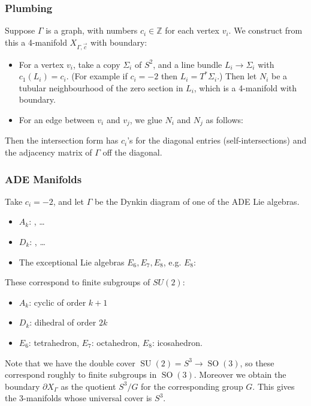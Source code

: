 \documentclass{article}
\theoremstyle{definition}
\DeclareMathOperator{\SO}{SO}
\DeclareMathOperator{\SU}{SU}
\newcommand{\Z}{\mathbb{Z}}
\begin{document}
\subsubsection*{Plumbing}

Suppose $\Gamma$ is a graph, with numbers $c_i\in\Z$ for each vertex $v_i$. We
construct from this a 4-manifold $X_{\Gamma,\vec c}$ with boundary:
\begin{itemize}
    \item For a vertex $v_i$, take a copy $\Sigma_i$ of $S^2$, and a line bundle
        $L_i\to\Sigma_i$ with $c_1(L_i)=c_i$. (For example if $c_i=-2$ then
        $L_i=T^*\Sigma_i$.) Then let $N_i$ be a tubular neighbourhood of the
        zero section in $L_i$, which is a 4-manifold with boundary.

    \item For an edge between $v_i$ and $v_j$, we glue $N_i$ and $N_j$ as
        follows:
\end{itemize}
Then the intersection form has $c_i$'s for the diagonal entries
(self-intersections) and the adjacency matrix of $\Gamma$ off the diagonal.

\subsubsection*{ADE Manifolds}

Take $c_i=-2$, and let $\Gamma$ be the Dynkin diagram of one of the ADE Lie
algebras.
\begin{itemize}
    \item $A_k$: , \ldots
    \item $D_k$: , \ldots
    \item The exceptional Lie algebras $E_6,E_7,E_8$, e.g. $E_8$: 
\end{itemize}
These correspond to finite subgroups of $SU(2)$:
\begin{itemize}
    \item $A_k$: cyclic of order $k+1$
    \item $D_k$: dihedral of order $2k$
    \item $E_6$: tetrahedron, $E_7$: octahedron, $E_8$: icosahedron.
\end{itemize}
Note that we have the double cover $\SU(2)=S^3\to\SO(3)$, so these correspond
roughly to finite subgroups in $\SO(3)$. Moreover we obtain the boundary
$\partial X_\Gamma$ as the quotient $S^3/G$ for the corresponding group $G$.
This gives the 3-manifolds whose universal cover is $S^3$.
\end{document}
